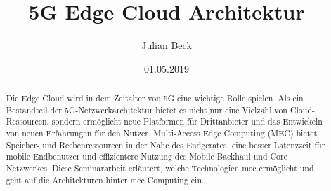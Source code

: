 \documentclass[runningheads]{llncs}
\title{5G Edge Cloud Architektur}
\author{Julian Beck}
\institute{Betreuer: Prof. Dr. rer. nat. Oliver Waldhorst}
\date{01.05.2019}
\numberwithin{figure}{section}
\begin{document}
\let\oldaddcontentsline\addcontentsline
\def\addcontentsline#1#2#3{}
\maketitle
\def\addcontentsline#1#2#3{\oldaddcontentsline{#1}{#2}{#3}}



\begin{abstract}
  Die Edge Cloud wird in dem Zeitalter von 5G eine wichtige Rolle spielen. 
  Als ein Bestandteil der 5G-Netzwerkarchitektur bietet es nicht nur eine Vielzahl von Cloud-Ressourcen, sondern
  ermöglicht neue Platformen für Drittanbieter und das Entwickeln von neuen Erfahrungen für den Nutzer.
  Multi-Access Edge Computing (MEC) bietet Speicher- und Rechenressourcen in der Nähe des Endgerätes, 
  eine besser Latenzzeit für mobile Endbenutzer und effizientere Nutzung des Mobile Backhaul
  und Core Netzwerkes. Diese Seminararbeit erläutert, welche Technologien \acrfull{mec} ermöglicht und geht auf die Architekturen 
  hinter \Acrshort{mec} Computing ein.
\end{abstract}

\tableofcontents 
\newpage
\printglossary[type=\acronymtype]
\newpage
\end{document}
